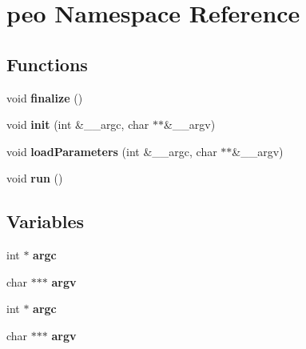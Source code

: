 \section{peo Namespace Reference}
\label{namespacepeo}


\subsection*{Functions}
\begin{CompactItemize}
\item 
void {\bf finalize} ()\label{namespacepeo_f90478489cc92d1e6abb222179163a30}

\item 
void {\bf init} (int \&\_\-\_\-argc, char $\ast$$\ast$\&\_\-\_\-argv)\label{namespacepeo_8184c3b1f7eecc68f69bb8e8b872a7d3}

\item 
void {\bf load\-Parameters} (int \&\_\-\_\-argc, char $\ast$$\ast$\&\_\-\_\-argv)\label{namespacepeo_2b496ee9b81d9ae322ae6edb9a93dc71}

\item 
void {\bf run} ()\label{namespacepeo_10819b2d60b37477c6a89b60c595c67c}

\end{CompactItemize}
\subsection*{Variables}
\begin{CompactItemize}
\item 
int $\ast$ {\bf argc}\label{namespacepeo_18a3998ce8b39c4e1143914fdd07b3d2}

\item 
char $\ast$$\ast$$\ast$ {\bf argv}\label{namespacepeo_d07043237d4d923125e38860ba9bbe20}

\item 
int $\ast$ {\bf argc}\label{namespacepeo_18a3998ce8b39c4e1143914fdd07b3d2}

\item 
char $\ast$$\ast$$\ast$ {\bf argv}\label{namespacepeo_d07043237d4d923125e38860ba9bbe20}

\end{CompactItemize}
